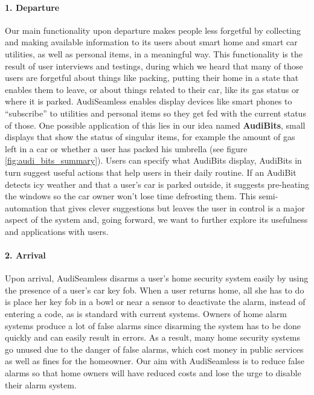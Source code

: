 \paragraph*{1. Departure} Our main functionality upon departure makes people less forgetful by collecting and making available information to its users about smart home and smart car utilities, as well as personal items, in a meaningful way. This functionality is the result of user interviews and testings, during which we heard that many of those users are forgetful about things like packing, putting their home in a state that enables them to leave, or about things related to their car, like its gas status or where it is parked. AudiSeamless enables display devices like smart phones to ``subscribe'' to utilities and personal items so they get fed with the current status of those. One possible application of this lies in our idea named \textbf{AudiBits}, small displays that show the status of singular items, for example the amount of gas left in a car or whether a user has packed his umbrella (see figure \ref{fig:audi_bits_summary}). Users can specify what AudiBits display, AudiBits in turn suggest useful actions that help users in their daily routine. If an AudiBit detects icy weather and that a user's car is parked outside, it suggests pre-heating the windows so the car owner won't lose time defrosting them. This semi-automation that gives clever suggestions but leaves the user in control is a major aspect of the system and, going forward, we want to further explore its usefulness and applications with users.

\paragraph*{2. Arrival} Upon arrival, AudiSeamless disarms a user's home security system easily by using the presence of a user's car key fob. When a user returns home, all she has to do is place her key fob in a bowl or near a sensor to deactivate the alarm, instead of entering a code, as is standard with current systems.
Owners of home alarm systems produce a lot of false alarms since disarming the system has to be done quickly and can easily result in errors. As a result, many home security systems go unused due to the danger of false alarms, which cost money in public services as well as fines for the homeowner. Our aim with AudiSeamless is to reduce false alarms so that home owners will have reduced costs and lose the urge to disable their alarm system.

